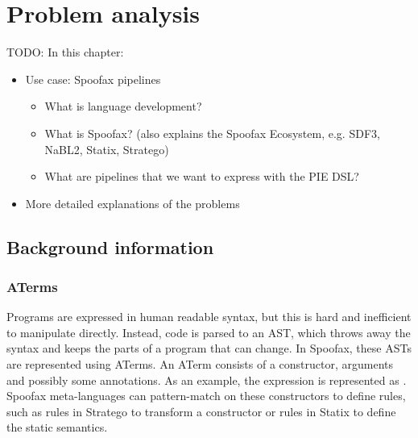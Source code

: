 
\section{Problem analysis}
\label{sec:problem_analysis}

TODO: In this chapter:
\begin{itemize}
  \item Use case: Spoofax pipelines
  \begin{itemize}
    \item What is language development?
    \item What is Spoofax? (also explains the Spoofax Ecosystem, e.g. SDF3, NaBL2, Statix, Stratego)
    \item What are pipelines that we want to express with the PIE DSL?
  \end{itemize}
  \item More detailed explanations of the problems
\end{itemize}

\subsection{Background information}
\label{subsec:problem_analysis__background}


\subsubsection{ATerms}
\label{subsubsec:problem_analysis__background__aterms}

Programs are expressed in human readable syntax, but this is hard and inefficient to manipulate directly.
Instead, code is parsed to an \ac{AST}, which throws away the syntax and keeps the parts of a program that can change.
In Spoofax, these \acp{AST} are represented using ATerms.
An ATerm consists of a constructor, arguments and possibly some annotations.
As an example, the expression  is represented as .
Spoofax meta-languages can pattern-match on these constructors to define rules, such as rules in Stratego to transform a constructor or rules in Statix to define the static semantics.

